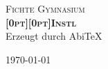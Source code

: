 \begin{titlepage}

\begin{center}



\textsc{\LARGE Fichte Gymnasium}\\[1.5cm]




\textsc{ \huge \bfseries \raisebox{0pt}[0pt][0pt]{Inst\/\raisebox{-0.2ex}{A}\raisebox{-0.4ex}{B}\raisebox{0.1ex}{I}\/l}}
\vspace {1cm}
\\Erzeugt durch Abi\TeX



\vfill

{\large \today}

\end{center}

\end{titlepage}

